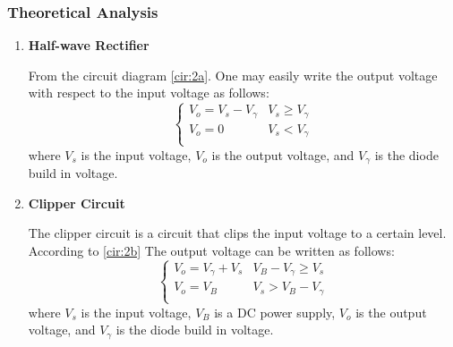     \subsubsection{Theoretical Analysis}
        \begin{enumerate}[a]
            \item \textbf{Half-wave Rectifier}\par
                From the circuit diagram \ref{cir:2a}. One may easily write the output voltage with respect to the input voltage as follows:
                \begin{equation}
                    \begin{cases}
                        V_o = V_s - V_\gamma & V_s \ge V_\gamma\\
                        V_o = 0 & V_s < V_\gamma\\
                    \end{cases}
                \label{eq:2ret}
                \end{equation}
                where $V_s$ is the input voltage, $V_o$ is the output voltage, and $V_\gamma$ is the diode build in voltage.
            
            \item \textbf{Clipper Circuit}\par
                The clipper circuit is a circuit that clips the input voltage to a certain level. According to \ref{cir:2b} The output voltage can be written as follows:
                \begin{equation}
                    \begin{cases}
                        V_o = V_\gamma + V_s & V_B - V_\gamma \ge V_s\\
                        V_o = V_B & V_s > V_B - V_\gamma\\
                    \end{cases}
                \label{eq:2clip}
                \end{equation}
                where $V_s$ is the input voltage, $V_B$ is a DC power supply, $V_o$ is the output voltage, and $V_\gamma$ is the diode build in voltage.
            

\end{enumerate}

